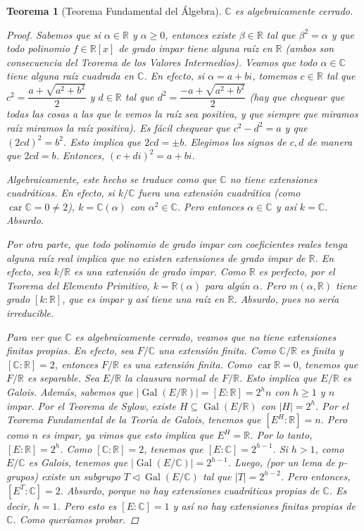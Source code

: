 \documentclass[12pt]{book}
\newtheorem{teo}{Teorema}[section]
\theoremstyle{definition}
\newcommand{\CC}{\mathbb{C}}
\newcommand{\RR}{\mathbb{R}}      %
\DeclareMathOperator{\car}{car}
\DeclareMathOperator{\Gal}{Gal}
\begin{document}
\begin{teo}[Teorema Fundamental del Álgebra]
$\CC$ es algebraicamente cerrado.
\begin{proof}

Sabemos que si $\alpha\in\RR$ y $\alpha\geq 0$, entonces existe $\beta\in\RR$ tal que $\beta^2 =\alpha$ y que todo polinomio $f\in\RR[x]$ de grado impar tiene alguna raíz en $\RR$ (ambos son consecuencia del Teorema de los Valores Intermedios). Veamos que todo $\alpha\in\CC$ tiene alguna raíz cuadrada en $\CC$. En efecto, si $\alpha = a+bi$, tomemos $c\in\RR$ tal que $c^2 = \dfrac{a+\sqrt{a^2+b^2}}{2}$ y $d\in\RR$ tal que $d^2 = \dfrac{-a+\sqrt{a^2+b^2}}{2}$ (hay que chequear que todas las cosas a las que le vemos la raíz sea positiva, y que siempre que miramos raíz miramos la raíz positiva). Es fácil chequear que $c^2 - d^2 = a$ y que $(2cd)^2 = b^2$. Esto implica que $2cd=\pm b$. Elegimos los signos de $c,d$ de manera que $2cd = b$. Entonces, $(c+di)^2 = a + bi$.

Algebraicamente, este hecho se traduce como que $\CC$ no tiene extensiones cuadráticas. En efecto, si $k/\CC$ fuera una extensión cuadrática (como $\car \CC = 0\neq 2$), $k=\CC(\alpha)$ con $\alpha^2\in\CC$. Pero entonces $\alpha\in\CC$ y así $k=\CC$. Absurdo.

Por otra parte, que todo polinomio de grado impar con coeficientes reales tenga alguna raíz real implica que no existen extensiones de grado impar de $\RR$. En efecto, sea $k/\RR$ es una extensión de grado impar. Como $\RR$ es perfecto, por el Teorema del Elemento Primitivo, $k=\RR(\alpha)$ para algún $\alpha$. Pero $m(\alpha,\RR)$ tiene grado $[k:\RR]$, que es impar y así tiene una raíz en $\RR$. Absurdo, pues no sería irreducible.

Para ver que $\CC$ es algebraicamente cerrado, veamos que no tiene extensiones finitas propias. En efecto, sea $F/\CC$ una extensión finita. Como $\CC/\RR$ es finita y $[\CC:\RR]=2$, entonces $F/\RR$ es una extensión finita. Como $\car\RR=0$, tenemos que $F/\RR$ es separable. Sea $E/\RR$ la clausura normal de $F/\RR$. Esto implica que $E/\RR$ es Galois.
Además, sabemos que $|\Gal(E/\RR)| = [E:\RR] = 2^h n$ con $h\geq 1$ y $n$ impar. Por el Teorema de Sylow, existe $H\subseteq \Gal(E/\RR)$ con $|H|=2^h$. Por el Teorema Fundamental de la Teoría de Galois, tenemos que $[E^H:\RR]=n$. Pero como $n$ es impar, ya vimos que esto implica que $E^H = \RR$. Por lo tanto, $[E:\RR]=2^h$. Como $[\CC:\RR]=2$, tenemos que $[E:\CC]=2^{h-1}$. Si $h>1$,  como $E/\CC$ es Galois, tenemos que $|\Gal(E/\CC)| = 2^{h-1}$. Luego, (por un lema de $p$-grupos) existe un subgrupo $T\triangleleft \Gal(E/\CC)$ tal que $|T| = 2^{h-2}$. Pero entonces, $[E^T : \CC]=2$. Absurdo, porque no hay extensiones cuadráticas propias de $\CC$. Es decir, $h=1$. Pero esto es $[E:\CC] = 1$ y así no hay extensiones finitas propias de $\CC$. Como queríamos probar.

\end{proof}
\end{teo}
\end{document}
